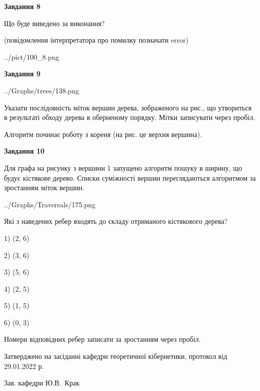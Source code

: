 \documentclass[12pt, ukrainian]{article}
\begin{document}
{\begin {large}
{\begin {center}\textbf{Завдання 8}\end {center}}\par
Що буде виведено за виконання?\par
 (повідомлення інтерпретатора про помилку позначати error)\par
\begin{center}
	{../pict/100_8.png}
\end{center}
\newpage

{\begin {center}\textbf{Завдання 9}\end {center}}\par

\begin{center}
	{../Graphs/trees/138.png}
\end{center}
Указати послідовність міток вершин дерева, зображеного на рис., що утвориться в результаті обходу дерева в оберненому порядку. Мітки записувати через пробіл.\par Алгоритм починає роботу з кореня (на рис. це верхня вершина).\par
\newpage

{\begin {center}\textbf{Завдання 10}\end {center}}\par
Для графа на рисунку з вершини 1 запущено алгоритм пошуку в ширину, що будує кістякове дерево. Списки суміжності вершин переглядаються алгоритмом за зростанням міток вершин.\par
\begin{center}
	{../Graphs/Traversals/175.png}
\end{center}
\par Які з наведених ребер входять до складу отриманого кістякового дерева?\par
1) (2, 6)\par
2) (3, 6)\par
3) (5, 6)\par
4) (2, 5)\par
5) (1, 5)\par
6) (0, 3)\par
{\vskip 15pt} Номери відповідних ребер записати за зростанням через пробіл.\par
\newpage


\end {large}
}
{\smallskip \begin {small} Затверджено на засіданні кафедри теоретичної кібернетики, протокол  від   29.01.2022 р.\par\smallskip\smallskip
{\parbox {6.5 cm}{Зав. кафедри \dotfill Ю.В.~Крак}} \end{small}}
\end{document}
